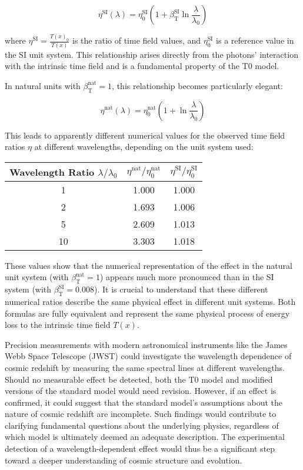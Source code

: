 \documentclass[12pt,a4paper]{article}
\newcommand{\Tfield}{T(x)}
\newcommand{\betaT}{\beta_{\text{T}}}
\begin{document}
	\begin{equation}
		\eta^{\text{SI}}(\lambda) = \eta_0^{\text{SI}} \left(1 + \betaT^{\text{SI}} \ln \frac{\lambda}{\lambda_0}\right)
	\end{equation}
	
	where \(\eta^{\text{SI}} = \frac{\Tfield_0}{\Tfield}\) is the ratio of time field values, and \(\eta_0^{\text{SI}}\) is a reference value in the SI unit system. This relationship arises directly from the photons’ interaction with the intrinsic time field and is a fundamental property of the T0 model.
	
	In natural units with \(\betaT^{\text{nat}} = 1\), this relationship becomes particularly elegant:
	
	\begin{equation}
		\eta^{\text{nat}}(\lambda) = \eta_0^{\text{nat}} \left(1 + \ln \frac{\lambda}{\lambda_0}\right)
	\end{equation}
	
	This leads to apparently different numerical values for the observed time field ratios \(\eta\) at different wavelengths, depending on the unit system used:
	
	\begin{center}
		\begin{tabular}{|c|c|c|}
			\hline
			\textbf{Wavelength Ratio \(\lambda/\lambda_0\)} & \textbf{\(\eta^{\text{nat}}/\eta_0^{\text{nat}}\)} & \textbf{\(\eta^{\text{SI}}/\eta_0^{\text{SI}}\)} \\
			\hline
			1 & 1.000 & 1.000 \\
			2 & 1.693 & 1.006 \\
			5 & 2.609 & 1.013 \\
			10 & 3.303 & 1.018 \\
			\hline
		\end{tabular}
	\end{center}
	
	These values show that the numerical representation of the effect in the natural unit system (with \(\betaT^{\text{nat}} = 1\)) appears much more pronounced than in the SI system (with \(\betaT^{\text{SI}} = 0.008\)). It is crucial to understand that these different numerical ratios describe the same physical effect in different unit systems. Both formulas are fully equivalent and represent the same physical process of energy loss to the intrinsic time field \(\Tfield\).
	
	Precision measurements with modern astronomical instruments like the James Webb Space Telescope (JWST) could investigate the wavelength dependence of cosmic redshift by measuring the same spectral lines at different wavelengths. Should no measurable effect be detected, both the T0 model and modified versions of the standard model would need revision. However, if an effect is confirmed, it could suggest that the standard model’s assumptions about the nature of cosmic redshift are incomplete. Such findings would contribute to clarifying fundamental questions about the underlying physics, regardless of which model is ultimately deemed an adequate description. The experimental detection of a wavelength-dependent effect would thus be a significant step toward a deeper understanding of cosmic structure and evolution.
	
\end{document}
